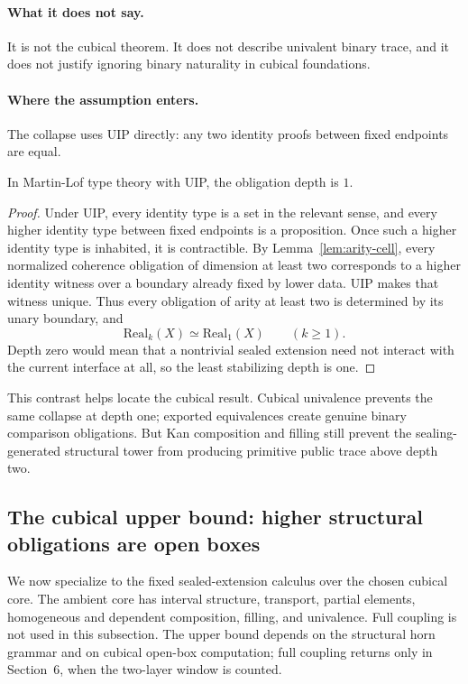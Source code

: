 \documentclass{lmcs}
\begin{document}
\paragraph{What it does not say.}
It is not the cubical theorem.  It does not describe univalent binary trace, and it does not
justify ignoring binary naturality in cubical foundations.

\paragraph{Where the assumption enters.}
The collapse uses UIP directly: any two identity proofs between fixed endpoints are equal.

\begin{thm}
\label{thm:UIP-depth-one}
In Martin-Lof type theory with UIP, the obligation depth is \(1\).
\end{thm}

\begin{proof}
Under UIP, every identity type is a set in the relevant sense, and every higher identity type
between fixed endpoints is a proposition.  Once such a higher identity type is inhabited, it
is contractible.  By Lemma~\ref{lem:arity-cell}, every normalized coherence obligation of
dimension at least two corresponds to a higher identity witness over a boundary already fixed
by lower data.  UIP makes that witness unique.  Thus every obligation of arity at least two
is determined by its unary boundary, and
\[
  \mathrm{Real}_k(X) \simeq \mathrm{Real}_1(X)
  \qquad (k\geq 1).
\]
Depth zero would mean that a nontrivial sealed extension need not interact with the current
interface at all, so the least stabilizing depth is one.
\end{proof}

This contrast helps locate the cubical result.  Cubical univalence prevents the same collapse
at depth one; exported equivalences create genuine binary comparison obligations.  But Kan
composition and filling still prevent the sealing-generated structural tower from producing
primitive public trace above depth two.

\subsection{The cubical upper bound: higher structural obligations are open boxes}
\label{subsec:cubical-upper-bound}

We now specialize to the fixed sealed-extension calculus over the chosen cubical core.  The
ambient core has interval structure, transport, partial elements, homogeneous and dependent
composition, filling, and univalence.  Full coupling is not used in this subsection.  The
upper bound depends on the structural horn grammar and on cubical open-box computation;
full coupling returns only in Section~6, when the two-layer window is counted.
\end{document}
